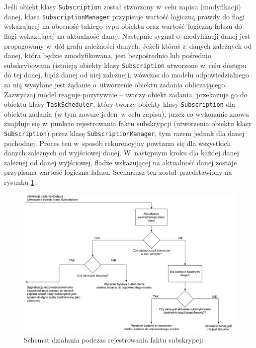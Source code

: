 Jeśli obiekt klasy \lstinline$Subscription$ został stworzony w~celu zapisu (modyfikacji) danej, klasa \lstinline$SubscriptionManager$ przypisuje wartość logiczną prawdy do flagi wskazującej na obecność takiego typu obiektu oraz wartość logiczną fałszu do flagi wskazującej na aktualność danej. Następnie sygnał o~modyfikacji danej jest propagowany w~dół grafu zależności danych. Jeżeli któraś z~danych zależnych od danej, która będzie zmodyfikowana, jest bezpośrednio lub pośrednio subskrybowana (istnieją obiekty klasy \lstinline$Subscription$ utworzone w~celu dostępu do tej danej, bądź danej od niej zależnej), wówczas do modelu odpowiedzialnego za nią wysyłane jest żądanie o~utworzenie obiektu zadania obliczającego. Zazwyczaj model reaguje pozytywnie -- tworzy obiekt zadania, przekazuje go do obiektu klasy \lstinline$TaskScheduler$, który tworzy obiekty klasy \lstinline$Subscription$ dla obiektu zadania (w tym zawsze jeden w celu zapisu), przez co wykonanie znowu znajduje się w~punkcie rejestrowania faktu subskrypcji (utworzenia obiektu klasy \lstinline$Subscription$) przez klasę \lstinline$SubscriptionManager$, tym razem jednak dla danej pochodnej. Proces ten w~sposób rekurencyjny powtarza się dla wszystkich danych zależnych od wyjściowej danej. W~następnym kroku dla każdej danej zależnej od danej wyjściowej, fladze wskazującej na aktualność danej zostaje przypisana wartość logiczna fałszu. Scenariusz ten został przedstawiony na rysunku \ref{fig:subscribe}.

\begin{figure}[ht]
	\centering
	\includegraphics[width=1\linewidth]{rys05/subscribe}
	\caption{Schemat działania podczas rejestrowania faktu subskrypcji}
	\label{fig:subscribe}	
\end{figure}

